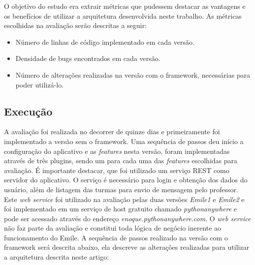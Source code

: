 O objetivo do estudo era extrair métricas que pudessem destacar as vantagens e os benefícios de utilizar a arquitetura desenvolvida neste trabalho. As métricas escolhidas na avaliação serão descritas a seguir:

\begin{itemize}
	\item Número de linhas de código implementado em cada versão.

	\item Densidade de bugs encontrados em cada versão.

	\item Número de alterações realizadas na versão com o framework, necessárias para poder utilizá-lo.
\end{itemize}

\subsection{Execução}
A avaliação foi realizada no decorrer de quinze dias e primeiramente foi implementado a versão sem o framework. Uma sequência de passos deu início a configuração do aplicativo e as \textit{features} nesta versão, foram implementadas através de três plugins, sendo um para cada uma das \textit{features} escolhidas para avaliação. É importante destacar, que foi utilizado um serviço REST  como servidor do aplicativo. O serviço é necessário para login e obtenção dos dados do usuário, além de listagem das turmas para envio de mensagem pelo professor. Este \textit{web service} foi utilizado na avaliação pelas duas versões \textit{Emile1} e \textit{Emile2} e foi implementado em um serviço de host gratuito chamado \textit{pythonanywhere} e pode ser acessado através do endereço \textit{enoque.pythonanywhere.com}. O \textit{web service} não faz parte da avaliação e constitui toda lógica de negócio inerente ao funcionamento do Emile. A sequência de passos realizado na versão com o framework será descrita abaixo, ela descreve as alterações realizadas para utilizar a arquitetura descrita neste artigo:

